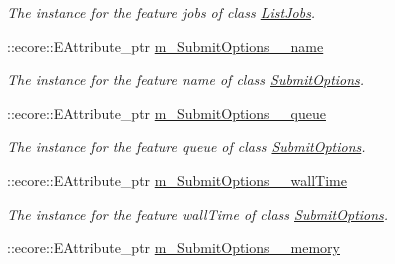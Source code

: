 \begin{DoxyCompactItemize}
\begin{DoxyCompactList}\small\item\em The instance for the feature jobs of class \hyperlink{classTMS__Data_1_1ListJobs}{ListJobs}. \item\end{DoxyCompactList}\item 
\hypertarget{classTMS__Data_1_1TMS__DataPackage_a83025ebe65784f9ebdb403398b7bdff6}{
::ecore::EAttribute\_\-ptr \hyperlink{classTMS__Data_1_1TMS__DataPackage_a83025ebe65784f9ebdb403398b7bdff6}{m\_\-SubmitOptions\_\-\_\-name}}
\label{classTMS__Data_1_1TMS__DataPackage_a83025ebe65784f9ebdb403398b7bdff6}

\begin{DoxyCompactList}\small\item\em The instance for the feature name of class \hyperlink{classTMS__Data_1_1SubmitOptions}{SubmitOptions}. \item\end{DoxyCompactList}\item 
\hypertarget{classTMS__Data_1_1TMS__DataPackage_ac25ab58d310a527f9daca9aacd343a85}{
::ecore::EAttribute\_\-ptr \hyperlink{classTMS__Data_1_1TMS__DataPackage_ac25ab58d310a527f9daca9aacd343a85}{m\_\-SubmitOptions\_\-\_\-queue}}
\label{classTMS__Data_1_1TMS__DataPackage_ac25ab58d310a527f9daca9aacd343a85}

\begin{DoxyCompactList}\small\item\em The instance for the feature queue of class \hyperlink{classTMS__Data_1_1SubmitOptions}{SubmitOptions}. \item\end{DoxyCompactList}\item 
\hypertarget{classTMS__Data_1_1TMS__DataPackage_af59fa0e51733f91f75709e4b8b95c10f}{
::ecore::EAttribute\_\-ptr \hyperlink{classTMS__Data_1_1TMS__DataPackage_af59fa0e51733f91f75709e4b8b95c10f}{m\_\-SubmitOptions\_\-\_\-wallTime}}
\label{classTMS__Data_1_1TMS__DataPackage_af59fa0e51733f91f75709e4b8b95c10f}

\begin{DoxyCompactList}\small\item\em The instance for the feature wallTime of class \hyperlink{classTMS__Data_1_1SubmitOptions}{SubmitOptions}. \item\end{DoxyCompactList}\item 
\hypertarget{classTMS__Data_1_1TMS__DataPackage_a64c50e069a7306760f410fea6c0a8c6d}{
::ecore::EAttribute\_\-ptr \hyperlink{classTMS__Data_1_1TMS__DataPackage_a64c50e069a7306760f410fea6c0a8c6d}{m\_\-SubmitOptions\_\-\_\-memory}}
\label{classTMS__Data_1_1TMS__DataPackage_a64c50e069a7306760f410fea6c0a8c6d}


\end{DoxyCompactItemize}
